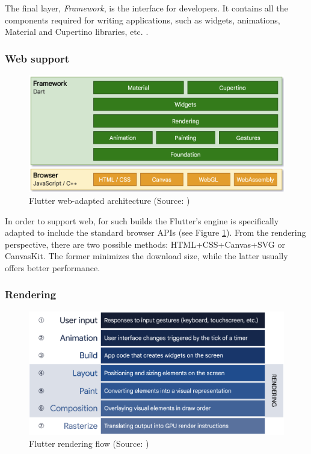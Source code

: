 The final layer, \emph{Framework}, is the interface for developers. It contains all the components required for writing applications, such as widgets, animations, Material and Cupertino libraries, etc. \cite{flutter_docs_architecture}.

\subsubsection*{Web support}

\begin{figure}[h]
    \centering
    \includegraphics[width=.77\textwidth]{img/flutter_web_architecture}
    \caption{Flutter web-adapted architecture (Source: \cite{flutter_docs_architecture})}
    \label{fig:flutter_web_architecture}
\end{figure}

In order to support web, for such builds the Flutter's engine is specifically adapted to include the standard browser APIs (see Figure \ref{fig:flutter_web_architecture}). From the rendering perspective, there are two possible methods: HTML+CSS+Canvas+SVG or CanvasKit. The former minimizes the download size, while the latter usually offers better performance.

\subsubsection*{Rendering}

\begin{figure}[h]
    \centering
    \includegraphics[width=\textwidth]{img/flutter_render_pipeline}
    \caption{Flutter rendering flow (Source: \cite{flutter_docs_architecture})}
    \label{fig:flutter_render_flow}
\end{figure}

